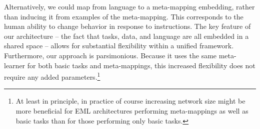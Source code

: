 \documentclass{article}
\begin{document}
Alternatively, we could map from language to a meta-mapping embedding, rather than inducing it from examples of the meta-mapping. This corresponds to the human ability to change behavior in response to instructions. The key feature of our architecture -- the fact that tasks, data, and language are all embedded in a shared space -- allows for substantial flexibility within a unified framework. Furthermore, our approach is parsimonious. Because it uses the same meta-learner for both basic tasks and meta-mappings, this increased flexibility does not require any added parameters.\footnote{At least in principle, in practice of course increasing network size might be more beneficial for EML architectures performing meta-mappings as well as basic tasks than for those performing only basic tasks.}  

%
\end{document}
